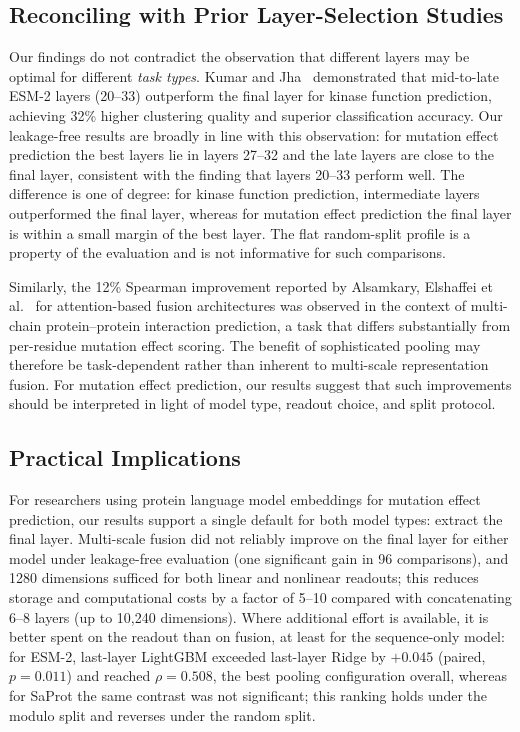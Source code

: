 \documentclass[11pt,a4paper]{article}
\newcommand{\rtwo}[1]{#1}
\newcommand{\rthree}[1]{#1}
\begin{document}
\subsection{Reconciling with Prior Layer-Selection Studies}

Our findings do not contradict the observation that different layers may be
optimal for different \emph{task types}. Kumar and Jha~\cite{kumar2025}
demonstrated that mid-to-late ESM-2 layers (20--33) outperform the final layer
for kinase function prediction, achieving 32\% higher clustering quality and
superior classification accuracy. \rthree{Our leakage-free results are broadly in line with this observation: for
mutation effect prediction the best layers lie in layers 27--32 and the late layers are
close to the final layer, consistent with the finding that layers 20--33 perform well.
The difference is one of degree: for kinase function prediction, intermediate layers
outperformed the final layer, whereas for mutation effect prediction the final layer is
within a small margin of the best layer. The flat random-split profile is a property of
the evaluation and is not informative for such comparisons.}

Similarly, the 12\% Spearman improvement reported by Alsamkary, Elshaffei
et al.~\cite{elshaffei2025} for attention-based fusion architectures was
observed in the context of multi-chain protein--protein interaction prediction,
a task that differs substantially from per-residue mutation effect scoring.
The benefit of sophisticated pooling may therefore be task-dependent rather than
inherent to multi-scale representation fusion. For mutation effect prediction,
our results suggest that such improvements should be interpreted in light of
model type, readout choice, and split protocol.

\subsection{Practical Implications}

\rtwo{For researchers using protein language model embeddings for mutation effect
prediction, our results support a single default for both model types: extract the
final layer. Multi-scale fusion \rthree{did not reliably improve on} the final layer for either
model under leakage-free evaluation \rthree{(one significant gain in 96 comparisons)}, and 1280 dimensions sufficed for both linear and
nonlinear readouts; this reduces storage and computational costs by a factor of 5--10
compared with concatenating 6--8 layers (up to 10,240 dimensions). Where additional
effort is available, it is better spent on the readout than on fusion, at least for
the sequence-only model: for ESM-2, last-layer LightGBM exceeded last-layer Ridge by
$+0.045$ (paired, $p = 0.011$) and reached $\rho = 0.508$, the best pooling
configuration overall, whereas for SaProt the same contrast was not significant\rthree{;
this ranking holds under the modulo split and reverses under the random split}.}
\end{document}
